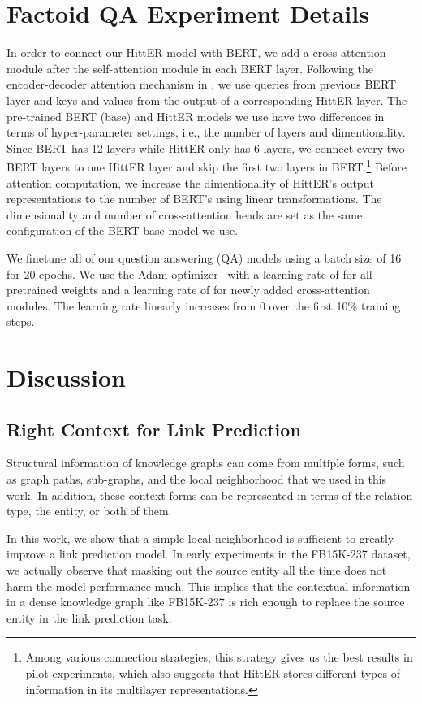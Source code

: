 \documentclass[11pt]{article}
\begin{document}
\section{Factoid QA Experiment Details}
In order to connect our HittER model with BERT, we add a cross-attention module after the self-attention module in each BERT layer.
Following the encoder-decoder attention mechanism in \citet{vaswani2017attention}, we use queries from previous BERT layer and keys and values from the output of a corresponding HittER layer.
The pre-trained BERT (base) and HittER models we use have two differences in terms of hyper-parameter settings, i.e., the number of layers and dimentionality.
Since BERT has 12 layers while HittER only has 6 layers, we connect every two BERT layers to one HittER layer and skip the first two layers in BERT.\footnote{
Among various connection strategies, this strategy gives us the best results in pilot experiments, which also suggests that HittER stores different types of information in its multilayer representations.}
Before attention computation, we increase the dimentionality of HittER's output representations to the number of BERT's using linear transformations.
The dimensionality and number of cross-attention heads are set as the same configuration of the BERT base model we use. 

We finetune all of our question answering (QA) models using a batch size of 16 for 20 epochs.
We use the Adam optimizer~\cite{kingma2014adam} with a learning rate of  for all pretrained weights and a learning rate of  for newly added cross-attention modules.
The learning rate linearly increases from 0 over the first 10\% training steps.

\section{Discussion}
\label{sec:discussion}

\subsection{Right Context for Link Prediction}

Structural information of knowledge graphs can come from multiple forms, such as graph paths, sub-graphs, and the local neighborhood that we used in this work. In addition, these context forms can be represented in terms of the relation type, the entity, or both of them. 

In this work, we show that a simple local neighborhood is sufficient to greatly improve a link prediction model.
In early experiments in the FB15K-237 dataset, we actually observe that masking out the source entity all the time does not harm the model performance much.
This implies that the contextual information in a dense knowledge graph like FB15K-237 is rich enough to replace the source entity in the link prediction task.
\end{document}
